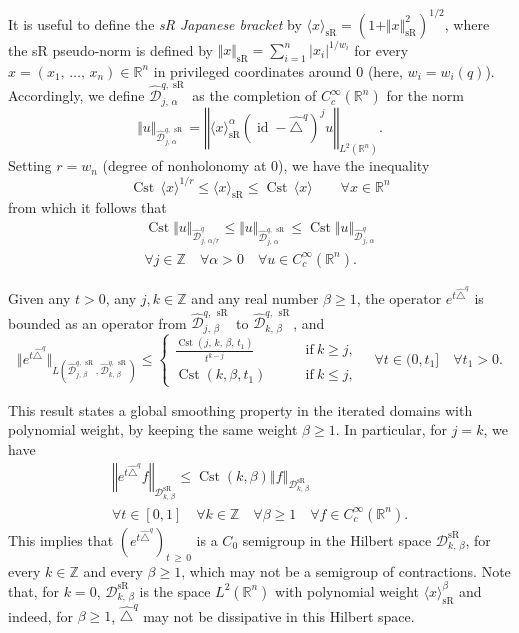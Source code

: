 \documentclass[10pt]{amsart}
\theoremstyle{definition}\newtheorem{defi}[theo]{Definition}\newtheorem{rema}[theo]{Remark}\newtheorem{exam}[theo]{Example}\newtheorem{exem}[theo]{Example}\newtheorem{nota}[theo]{Notation}
\newcommand*\R{\mathbb{R}}
\newcommand*\Z{\mathbb{Z}}
\newcommand{\calD}{\mathcal{D}}
\DeclareMathOperator{\Cst}{Cst}
\DeclareMathOperator{\id}{id}
\DeclareMathOperator{\sR}{sR}
\renewcommand{\geq}{\geqslant}
\renewcommand{\leq}{\leqslant}
\let\oldforall\forall
\renewcommand*{\forall}{\mathrel{\oldforall}}
\begin{document}
It is useful to define the \emph{sR Japanese bracket} by $\langle x\rangle_{\sR} = (1+\Vert x\Vert_{\sR}^2)^{1/2}$, where the sR pseudo-norm is defined by $\Vert x\Vert_{\sR} = \sum_{i=1}^n \vert x_i\vert^{1/w_i}$ for every $x=(x_1,\,\ldots,\,x_n)\in\R^n$ in privileged coordinates around $0$ (here, $w_i=w_i(q)$). Accordingly, we define $\widehat{\calD}_{j,\,\alpha}^{q,\sR}$ as the completion of $C_c^\infty(\R^n)$ for the norm
\[
\Vert u\Vert_{\widehat{\calD}_{j,\,\alpha}^{q,\,\sR}} = \left\Vert \langle x\rangle_{\sR}^\alpha\left(\id - \widehat{\triangle}^q\right)^j u\right\Vert_{L^2\left(\R^n\right)}.
\]
Setting $r=w_n$ (degree of nonholonomy at $0$), we have the inequality
\[
\Cst\, \langle x\rangle^{1/r} \leq \langle x\rangle_{\sR} \leq \Cst\, \langle x\rangle\qquad \forall x\in\R^n
\]
from which it follows that
\begin{multline}\label{equivDjalpha}
\Cst \Vert u\Vert_{\widehat{\calD}^q_{j,\,\alpha/r}} \leq \Vert u\Vert_{\widehat{\calD}_{j,\,\alpha}^{q,\,\sR}} \leq \Cst \Vert u\Vert_{\widehat{\calD}^q_{j,\,\alpha}} \\
\forall j\in\Z\quad\forall\alpha>0\quad\forall u\in C_c^\infty(\R^n).
\end{multline}


\begin{prop}\label{prop_globreg_poidsfixe}
Given any $t>0$, any $j,k\in\Z$ and any real number $\beta\geq 1$, the operator $e^{t\widehat{\triangle}^q}$ is bounded as an operator from $\widehat{\calD}^{q,\,\sR}_{j,\,\beta}$ to $\widehat{\calD}^{q,\,\sR}_{k,\,\beta}$, and
\begin{equation}\label{estim_domainhat}
\Vert e^{t\widehat{\triangle}^q}\Vert_{L\left(\widehat{\calD}_{j,\,\beta}^{q,\,\sR},\widehat{\calD}_{k,\,\beta}^{q,\,\sR}\right)} \leq
\begin{cases}
\frac{\Cst\left(j,\,k,\,\beta,\,t_1\right)}{t^{k-j}} \qquad & \text{if}\ k\geq j, \\[2mm]
\Cst(k,\beta,t_1) \qquad & \text{if}\ k\leq j,
\end{cases}
\quad \forall t\in(0,t_1]\quad\forall t_1>0.
\end{equation}
\end{prop}

This result states a global smoothing property in the iterated domains with polynomial weight, by keeping the same weight $\beta\geq 1$. In particular, for $j=k$, we have
\begin{multline}\label{15:34}
\left\Vert e^{t\widehat{\triangle}^q} f\right\Vert_{\calD_{k,\,\beta}^{\sR}}
\leq \Cst(k,\beta) \left\Vert f\right\Vert_{\calD_{k,\,\beta}^{\sR}} \\
\forall t\in[0,1] \quad \forall k\in\Z\quad\forall\beta\geq 1\quad \forall f\in C_c^\infty(\R^n).
\end{multline}
This implies that $(e^{t\widehat{\triangle}^q})_{t\,\geq\,0}$ is a $C_0$ semigroup in the Hilbert space $\calD_{k,\,\beta}^{\sR}$, for every $k\in\Z$ and every $\beta\geq 1$, which may not be a semigroup of contractions. Note that, for $k=0$, $\calD_{k,\,\beta}^{\sR}$ is the space $L^2(\R^n)$ with polynomial weight $\langle x\rangle_{\sR}^\beta$ and indeed, for $\beta\geq 1$, $\widehat{\triangle}^q$ may not be dissipative in this Hilbert space.
\end{document}
